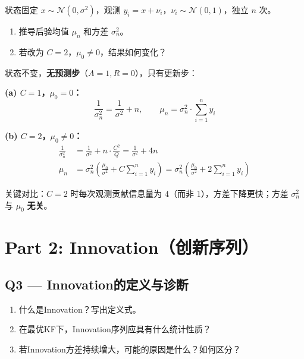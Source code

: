 \documentclass[12pt]{article}
\begin{document}
\begin{tcolorbox}[questionbox]
状态固定 $x \sim \mathcal{N}(0, \sigma^2)$，观测 $y_i = x + \nu_i$，$\nu_i \sim \mathcal{N}(0,1)$，独立 $n$ 次。

\begin{enumerate}[label=(\alph*)]
  \item 推导后验均值 $\mu_n$ 和方差 $\sigma_n^2$。
  \item 若改为 $C=2$，$\mu_0 \neq 0$，结果如何变化？
\end{enumerate}
\end{tcolorbox}

\begin{tcolorbox}[answerbox]
状态不变，\textbf{无预测步}（$A=1, R=0$），只有更新步：

\textbf{(a) $C=1$，$\mu_0=0$：}
\[
  \frac{1}{\sigma_n^2} = \frac{1}{\sigma^2} + n, \qquad
  \mu_n = \sigma_n^2 \cdot \sum_{i=1}^n y_i
\]

\textbf{(b) $C=2$，$\mu_0 \neq 0$：}
\begin{align*}
  \frac{1}{\sigma_n^2} &= \frac{1}{\sigma^2} + n \cdot \frac{C^2}{Q} = \frac{1}{\sigma^2} + 4n \\[4pt]
  \mu_n &= \sigma_n^2 \left(\frac{\mu_0}{\sigma^2} + C \sum_{i=1}^n y_i\right)
        = \sigma_n^2 \left(\frac{\mu_0}{\sigma^2} + 2\sum_{i=1}^n y_i\right)
\end{align*}

关键对比：$C=2$ 时每次观测贡献信息量为 $4$（而非 $1$），方差下降更快；方差 $\sigma_n^2$ 与 $\mu_0$ \textbf{无关}。
\end{tcolorbox}

\section*{Part 2: Innovation（创新序列）}

\subsection*{Q3 --- Innovation的定义与诊断}

\begin{tcolorbox}[questionbox]
\begin{enumerate}[label=(\alph*)]
  \item 什么是Innovation？写出定义式。
  \item 在最优KF下，Innovation序列应具有什么统计性质？
  \item 若Innovation方差持续增大，可能的原因是什么？如何区分？
\end{enumerate}
\end{tcolorbox}
\end{document}
